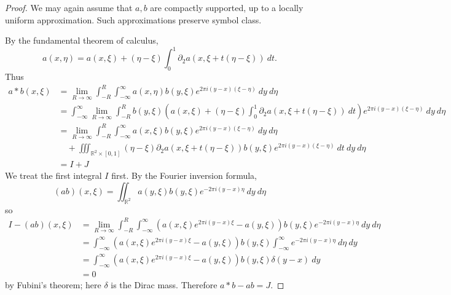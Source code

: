 \documentclass[12pt]{report}
\newcommand{\RR}{\mathbb{R}}
\theoremstyle{definition}
\begin{document}
\begin{proof}
We may again assume that $a,b$ are compactly supported, up to a locally uniform approximation.
Such approximations preserve symbol class.

By the fundamental theorem of calculus,
$$a(x, \eta) = a(x, \xi) + (\eta - \xi)\int_0^1 \partial_2a(x, \xi + t(\eta - \xi)) ~dt.$$
Thus
\begin{align*}
a*b(x, \xi) &= \lim_{R \to \infty} \int_{-R}^R \int_{-\infty}^\infty a(x, \eta) b(y, \xi) e^{2\pi i(y-x)(\xi - \eta)} ~dy ~d\eta\\
&= \int_{-\infty}^\infty \lim_{R \to \infty} \int_{-R}^R b(y, \xi)\left(a(x, \xi) + (\eta - \xi)\int_0^1 \partial_2a(x, \xi + t(\eta - \xi)) ~dt\right)e^{2\pi i(y-x)(\xi - \eta)} ~dy ~d\eta\\
&= \lim_{R \to \infty} \int_{-R}^R \int_{-\infty}^\infty  a(x, \xi) b(y, \xi) e^{2\pi i(y-x)(\xi - \eta)} ~dy~d\eta \\
&\quad+ \iiint_{\RR^2 \times [0, 1]} (\eta - \xi)\partial_2a(x, \xi + t(\eta - \xi))b(y, \xi)e^{2\pi i(y-x)(\xi - \eta)} ~dt~dy~d\eta\\
&= I + J
\end{align*}
We treat the first integral $I$ first. By the Fourier inversion formula,
$$(ab)(x, \xi) = \iint_{\RR^2} a(y, \xi)b(y, \xi) e^{-2\pi i(y-x)\eta} ~dy~d\eta$$
so
\begin{align*}
I - (ab)(x, \xi) &=\lim_{R \to \infty} \int_{-R}^R \int_{-\infty}^\infty  (a(x, \xi)e^{2\pi i(y-x)\xi} - a(y, \xi))b(y, \xi)e^{-2\pi i(y-x)\eta} ~dy ~d\eta\\
&= \int_{-\infty}^\infty (a(x, \xi)e^{2\pi i(y-x)\xi} - a(y, \xi))b(y, \xi) \int_{-\infty}^\infty e^{-2\pi i(y-x)\eta} ~d\eta~dy\\
&= \int_{-\infty}^\infty  (a(x, \xi)e^{2\pi i(y-x)\xi} - a(y, \xi))b(y, \xi) \delta(y - x) ~dy\\
&= 0
\end{align*}
by Fubini's theorem; here $\delta$ is the Dirac mass. Therefore $a*b - ab = J$.


\end{proof}
\end{document}
